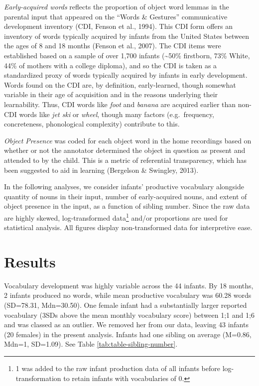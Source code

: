 \documentclass[
  english,
  man,floatsintext]{apa6}
\begin{document}
\emph{Early-acquired words} reflects the proportion of object word lemmas in the parental input that appeared on the \enquote{Words \& Gestures} communicative development inventory (CDI, Fenson et al., 1994). This CDI form offers an inventory of words typically acquired by infants from the United States between the ages of 8 and 18 months (Fenson et al., 2007). The CDI items were established based on a sample of over 1,700 infants (\textasciitilde50\% firstborn, 73\% White, 44\% of mothers with a college diploma), and so the CDI is taken as a standardized proxy of words typically acquired by infants in early development. Words found on the CDI are, by definition, early-learned, though somewhat variable in their age of acquisition and in the reasons underlying their learnability. Thus, CDI words like \emph{foot} and \emph{banana} are acquired earlier than non-CDI words like \emph{jet ski} or \emph{wheel}, though many factors (e.g.~frequency, concreteness, phonological complexity) contribute to this.

\emph{Object Presence} was coded for each object word in the home recordings based on whether or not the annotator determined the object in question as present and attended to by the child. This is a metric of referential transparency, which has been suggested to aid in learning (Bergelson \& Swingley, 2013).

In the following analyses, we consider infants' productive vocabulary alongside quantity of nouns in their input, number of early-acquired nouns, and extent of object presence in the input, as a function of sibling number. Since the raw data are highly skewed, log-transformed data\footnote{1 was added to the raw infant production data of all infants before log-transformation to retain infants with vocabularies of 0.} and/or proportions are used for statistical analysis. All figures display non-transformed data for interpretive ease.

\hypertarget{results}{%
\section{Results}\label{results}}

Vocabulary development was highly variable across the 44 infants. By 18 months, 2 infants produced no words, while mean productive vocabulary was 60.28 words (SD=78.31, Mdn=30.50). One female infant had a substantially larger reported vocabulary (3SDs above the mean monthly vocabulary score) between 1;1 and 1;6 and was classed as an outlier. We removed her from our data, leaving 43 infants (20 females) in the present analysis. Infants had one sibling on average (M=0.86, Mdn=1, SD=1.09). See Table \ref{tab:table-sibling-number}.
\end{document}
